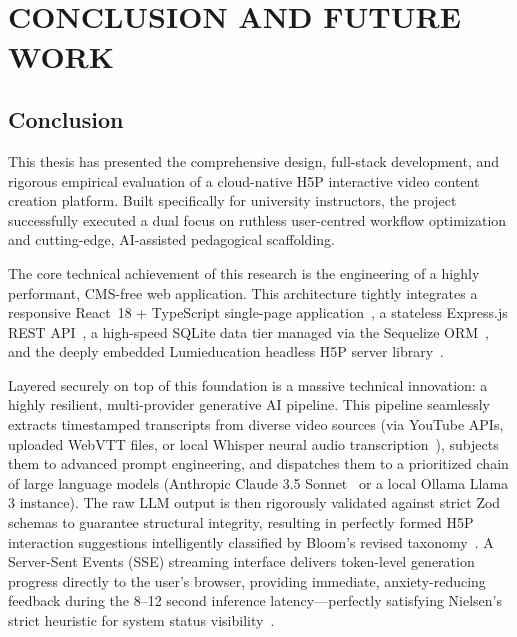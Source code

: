 \chapter{\\CONCLUSION AND FUTURE WORK}

\section{Conclusion}

This thesis has presented the comprehensive design, full-stack development, and rigorous empirical evaluation of a cloud-native H5P interactive video content creation platform. Built specifically for university instructors, the project successfully executed a dual focus on ruthless user-centred workflow optimization and cutting-edge, AI-assisted pedagogical scaffolding.

The core technical achievement of this research is the engineering of a highly performant, CMS-free web application. This architecture tightly integrates a responsive React~18 + TypeScript single-page application~\cite{react2023,typescript2023}, a stateless Express.js REST API~\cite{expressjs2023}, a high-speed SQLite data tier managed via the Sequelize ORM~\cite{sqlite2023,sequelize2023}, and the deeply embedded Lumieducation headless H5P server library~\cite{lumieducation2023}. 

Layered securely on top of this foundation is a massive technical innovation: a highly resilient, multi-provider generative AI pipeline. This pipeline seamlessly extracts timestamped transcripts from diverse video sources (via YouTube APIs, uploaded WebVTT files, or local Whisper neural audio transcription~\cite{radford2023}), subjects them to advanced prompt engineering, and dispatches them to a prioritized chain of large language models (Anthropic Claude 3.5 Sonnet~\cite{anthropic2024} or a local Ollama Llama 3 instance). The raw LLM output is then rigorously validated against strict Zod schemas to guarantee structural integrity, resulting in perfectly formed H5P interaction suggestions intelligently classified by Bloom's revised taxonomy~\cite{anderson2001}. A Server-Sent Events (SSE) streaming interface delivers token-level generation progress directly to the user's browser, providing immediate, anxiety-reducing feedback during the 8--12 second inference latency—perfectly satisfying Nielsen's strict heuristic for system status visibility~\cite{nielsen1994}.

